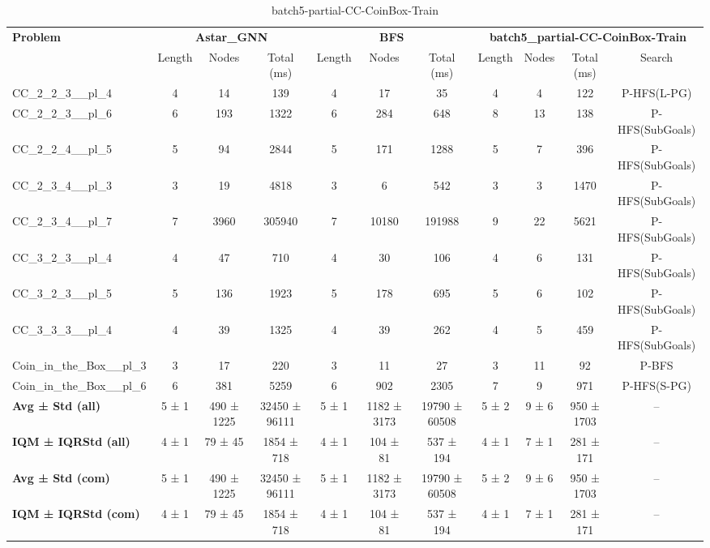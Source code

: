 \begin{table}[!ht]
\centering
\scriptsize
\begin{tabular}{l|ccc|ccc|cccc}
\multirow{2}{*}{\textbf{Problem}} & \multicolumn{3}{c|}{\textbf{Astar\_GNN}} & \multicolumn{3}{c|}{\textbf{BFS}} & \multicolumn{4}{c}{\textbf{batch5\_partial-CC-CoinBox-Train}} \\
\cline{2-11}
& Length & Nodes & Total (ms) & Length & Nodes & Total (ms) & Length & Nodes & Total (ms) & Search \\
\hline
CC\_2\_2\_3\_\_pl\_4 & 4 & 14 & 139 & 4 & 17 & 35 & 4 & 4 & 122 & P-HFS(L-PG) \\
CC\_2\_2\_3\_\_pl\_6 & 6 & 193 & 1322 & 6 & 284 & 648 & 8 & 13 & 138 & P-HFS(SubGoals) \\
CC\_2\_2\_4\_\_pl\_5 & 5 & 94 & 2844 & 5 & 171 & 1288 & 5 & 7 & 396 & P-HFS(SubGoals) \\
CC\_2\_3\_4\_\_pl\_3 & 3 & 19 & 4818 & 3 & 6 & 542 & 3 & 3 & 1470 & P-HFS(SubGoals) \\
CC\_2\_3\_4\_\_pl\_7 & 7 & 3960 & 305940 & 7 & 10180 & 191988 & 9 & 22 & 5621 & P-HFS(SubGoals) \\
CC\_3\_2\_3\_\_pl\_4 & 4 & 47 & 710 & 4 & 30 & 106 & 4 & 6 & 131 & P-HFS(SubGoals) \\
CC\_3\_2\_3\_\_pl\_5 & 5 & 136 & 1923 & 5 & 178 & 695 & 5 & 6 & 102 & P-HFS(SubGoals) \\
CC\_3\_3\_3\_\_pl\_4 & 4 & 39 & 1325 & 4 & 39 & 262 & 4 & 5 & 459 & P-HFS(SubGoals) \\
Coin\_in\_the\_Box\_\_pl\_3 & 3 & 17 & 220 & 3 & 11 & 27 & 3 & 11 & 92 & P-BFS \\
Coin\_in\_the\_Box\_\_pl\_6 & 6 & 381 & 5259 & 6 & 902 & 2305 & 7 & 9 & 971 & P-HFS(S-PG) \\
\hline
\textbf{Avg ± Std (all)} & 5 ± 1 & 490 ± 1225 & 32450 ± 96111 & 5 ± 1 & 1182 ± 3173 & 19790 ± 60508 & 5 ± 2 & 9 ± 6 & 950 ± 1703 & -- \\
\textbf{IQM ± IQRStd (all)} & 4 ± 1 & 79 ± 45 & 1854 ± 718 & 4 ± 1 & 104 ± 81 & 537 ± 194 & 4 ± 1 & 7 ± 1 & 281 ± 171 & -- \\
\textbf{Avg ± Std (com)} & 5 ± 1 & 490 ± 1225 & 32450 ± 96111 & 5 ± 1 & 1182 ± 3173 & 19790 ± 60508 & 5 ± 2 & 9 ± 6 & 950 ± 1703 & -- \\
\textbf{IQM ± IQRStd (com)} & 4 ± 1 & 79 ± 45 & 1854 ± 718 & 4 ± 1 & 104 ± 81 & 537 ± 194 & 4 ± 1 & 7 ± 1 & 281 ± 171 & -- \\
\end{tabular}
\caption{batch5-partial-CC-CoinBox-Train}
\label{tab:batch5_partial_CC-CoinBox_comparison_train}
\end{table}

